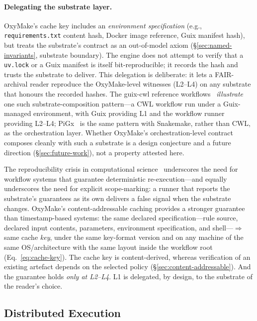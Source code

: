 \documentclass[12pt,a4paper]{article}
\newcommand{\code}[1]{{\texttt{\small\color{inlinecode}#1}}}
\begin{document}
\paragraph{Delegating the substrate layer.}
OxyMake's cache key includes an \emph{environment specification} (e.g.,
\code{requirements.txt} content hash, Docker image reference, Guix
manifest hash), but
treats the substrate's contract as an out-of-model axiom
(\S\ref{sec:named-invariants}, substrate boundary). The engine does not
attempt to verify that a \code{uv.lock} or a Guix manifest is itself
bit-reproducible; it records the hash and trusts the substrate to
deliver. This delegation is deliberate: it lets a FAIR-archival reader
reproduce the OxyMake-level witnesses (L2--L4) on any substrate that
honours the recorded hashes. The guix-cwl reference
workflows~\cite{prinsGuixCWLPipelines2018}
\emph{illustrate} one such substrate-composition pattern---a CWL
workflow run under a Guix-managed environment, with Guix providing L1 and
the workflow runner providing L2--L4; PiGx~\cite{wurmusPiGxReproducibleGenomics2018}
is the same pattern with Snakemake, rather than CWL, as the
orchestration layer. Whether OxyMake's
orchestration-level contract composes cleanly with such a substrate is
a design conjecture and a future direction
(\S\ref{sec:future-work}), not a property attested here.

The reproducibility crisis in computational
science~\cite{pengReproducibleResearchComputational2011,
stoddenEnhancingReproducibilityComputational2016} underscores the need for
workflow systems that guarantee deterministic re-execution---and equally
underscores the need for explicit scope-marking: a runner that reports the
substrate's guarantees as its own delivers a false signal when the substrate changes.
OxyMake's content-addressable caching provides a stronger guarantee than
timestamp-based systems: the same declared specification---rule
source, declared input contents, parameters, environment
specification, and shell---$\Rightarrow$ same cache \emph{key}, under
the same key-format version and on any machine of the same
OS/architecture with the same layout inside the workflow root
(Eq.~\ref{eq:cache-key}). The
cache key is content-derived, whereas verification of an existing
artefact depends on the selected policy
(\S\ref{sec:content-addressable}). And the guarantee holds \emph{only
at L2--L4}. L1 is delegated, by design, to the substrate of the
reader's choice.

\subsection{Distributed Execution}
\label{sec:distributed-related}
\end{document}
